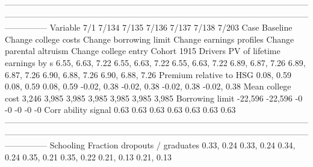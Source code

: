 ---------------------------------------------------------------------------------------------------------------------------------------------------------------------------------------------------------------------------------------
                              Variable                          7/1                        7/134                    7/135                     7/136                       7/137                       7/138                       7/203
                                  Case                     Baseline         Change college costs   Change borrowing limit  Change earnings profiles    Change parental altruism        Change college entry                 Cohort 1915
                               Drivers                                                                                                                                                                                                 
          PV of lifetime earnings by s             6.55, 6.63, 7.22             6.55, 6.63, 7.22         6.55, 6.63, 7.22          6.89, 6.87, 7.26            6.89, 6.87, 7.26            6.90, 6.88, 7.26            6.90, 6.88, 7.26
               Premium relative to HSG                   0.08, 0.59                   0.08, 0.59               0.08, 0.59               -0.02, 0.38                 -0.02, 0.38                 -0.02, 0.38                 -0.02, 0.38
                     Mean college cost                        3,246                        3,985                    3,985                     3,985                       3,985                       3,985                       3,985
                       Borrowing limit                      -22,596                      -22,596                       -0                        -0                          -0                          -0                          -0
                   Corr ability signal                         0.63                         0.63                     0.63                      0.63                        0.63                        0.63                        0.63
---------------------------------------------------------------------------------------------------------------------------------------------------------------------------------------------------------------------------------------
                             Schooling                                                                                                                                                                                                 
         Fraction dropouts / graduates                   0.33, 0.24                   0.33, 0.24               0.34, 0.24                0.35, 0.21                  0.35, 0.22                  0.21, 0.13                  0.21, 0.13
